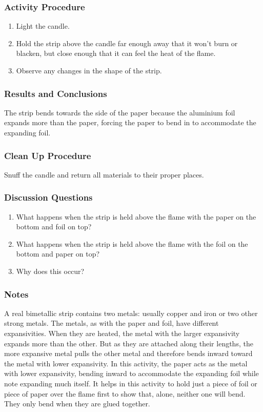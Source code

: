 \subsubsection*{Activity Procedure}
\begin{enumerate}
\item{Light the candle.} 
\item{Hold the strip above the candle far enough away that it won't burn or blacken, but close enough that it can feel the heat of the flame.} 
\item{Observe any changes in the shape of the strip.} 
\end{enumerate}

\subsubsection*{Results and Conclusions}
The strip bends towards the side of the paper because the aluminium foil expands more than the paper, forcing the paper to bend in to accommodate the expanding foil.  

\subsubsection*{Clean Up Procedure}
Snuff the candle and return all materials to their proper places.

\subsubsection*{Discussion Questions}
\begin{enumerate}
\item{What happens when the strip is held above the flame with the paper on the bottom and foil on top?}
\item{What happens when the strip is held above the flame with the foil on the bottom and paper on top?}
\item{Why does this occur?}
\end{enumerate}

\subsubsection*{Notes}
A real bimetallic strip contains two metals: usually copper and iron or two other strong metals. The metals, as with the paper and foil, have different expansivities. When they are heated, the metal with the larger expansivity expands more than the other. But as they are attached along their lengths, the more expansive metal pulls the other metal and therefore bends inward toward the metal with lower expansivity.  
In this activity, the paper acts as the metal with lower expansivity, bending inward to accommodate the expanding foil while note expanding much itself.  
It helps in this activity to hold just a piece of foil or piece of paper over the flame first to show that, alone, neither one will bend. They only bend when they are glued together.  


